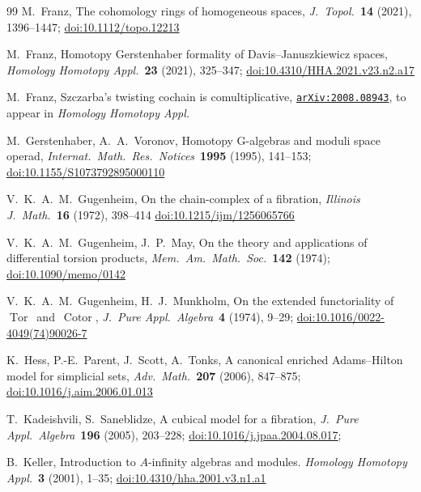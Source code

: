 \documentclass[letterpaper]{amsart}
\def\arxiv#1{\href{http://arxiv.org/abs/#1}{\texttt{arXiv:#1}}}
\def\doi#1{\href{http://doi.org/#1}{doi:#1}}
\numberwithin{equation}{section}
\theoremstyle{plain}
\theoremstyle{definition}
\theoremstyle{remark}
\begin{document}
\begin{thebibliography}{99}
M.~Franz,
\newblock The cohomology rings of homogeneous spaces,
\newblock \textit{J.\ Topol.}~\textbf{14} (2021), 1396--1447;
\newblock \doi{10.1112/topo.12213}

M.~Franz,
\newblock Homotopy Gerstenhaber formality of Davis--Januszkiewicz spaces,
\newblock \textit{Homology Homotopy Appl.}~\textbf{23} (2021), 325--347;
\newblock \doi{10.4310/HHA.2021.v23.n2.a17}

M.~Franz,
\newblock Szczarba's twisting cochain is comultiplicative,
\newblock \arxiv{2008.08943}, to appear in \textit{Homology Homotopy Appl.}

M.~Gerstenhaber, A.~A.~Voronov,
\newblock Homotopy G-algebras and moduli space operad,
\newblock \textit{Internat.\ Math.\ Res.\ Notices}~\textbf{1995} (1995), 141--153;
\newblock \doi{10.1155/S1073792895000110}

V.~K.~A.~M.~Gugenheim,
\newblock On the chain-complex of a fibration,
\newblock \textit{Illinois J.\ Math.}~\textbf{16} (1972), 398--414
\newblock \doi{10.1215/ijm/1256065766}

V.~K.~A.~M.~Gugenheim, J.~P.~May,
\newblock On the theory and applications of differential torsion products,
\newblock \textit{Mem.\ Am.\ Math.\ Soc.}~\textbf{142} (1974);
\newblock \doi{10.1090/memo/0142}

V.~K.~A.~M.~Gugenheim, H.~J.~Munkholm,
\newblock On the extended functoriality of $\operatorname{Tor}$~and~$\operatorname{Cotor}$,
\newblock \textit{J.~Pure Appl.\ Algebra}~\textbf{4} (1974), 9--29;
\newblock \doi{10.1016/0022-4049(74)90026-7}

K.~Hess, P.-E.~Parent, J.~Scott, A.~Tonks,
\newblock A canonical enriched Adams--Hilton model for simplicial sets,
\newblock \textit{Adv.\ Math.}~\textbf{207} (2006), 847--875;
\newblock \doi{10.1016/j.aim.2006.01.013}

T.~Kadeishvili, S.~Saneblidze,
\newblock A cubical model for a fibration,
\newblock \textit{J.~Pure Appl.\ Algebra}~\textbf{196} (2005), 203--228;
\newblock \doi{10.1016/j.jpaa.2004.08.017};

B.~Keller,
\newblock Introduction to $A$-infinity algebras and modules.
\newblock \textit{Homology Homotopy Appl.}~\textbf{3} (2001), 1--35;
\newblock \doi{10.4310/hha.2001.v3.n1.a1}


\end{thebibliography}
\end{document}
